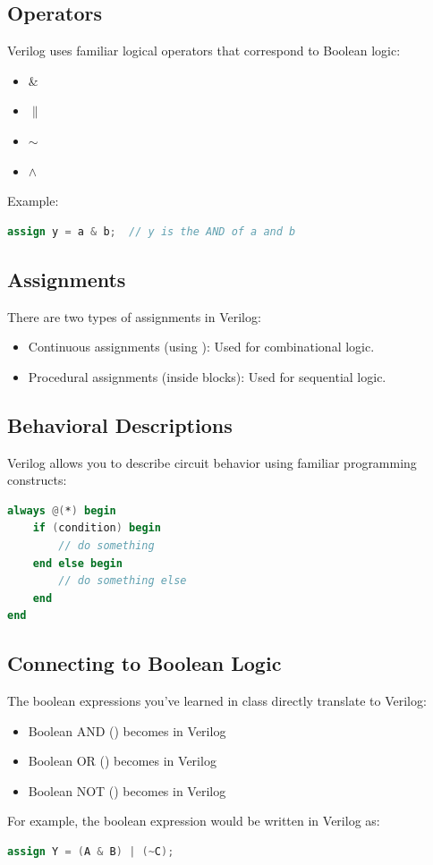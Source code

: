 \documentclass[12pt]{labmanual}
\begin{document}
\subsection{Operators}

Verilog uses familiar logical operators that correspond to Boolean logic:

\begin{itemize}
  \item {} \& 
  \item {} $\|$
  \item {} $\sim $
  \item {} $\wedge$
\end{itemize}

Example: \begin{lstlisting}[language=verilog]
assign y = a & b;  // y is the AND of a and b
\end{lstlisting}


\subsection{Assignments}
There are two types of assignments in Verilog:
\begin{itemize}
  \item Continuous assignments (using ): Used for combinational logic.
  \item Procedural assignments (inside  blocks): Used for sequential logic.
\end{itemize}

\subsection{Behavioral Descriptions}
Verilog allows you to describe circuit behavior using familiar programming constructs:
\begin{lstlisting}[language=verilog]    
always @(*) begin
    if (condition) begin
        // do something
    end else begin
        // do something else
    end
end
\end{lstlisting}

\subsection{Connecting to Boolean Logic}
The boolean expressions you've learned in class directly translate to Verilog:
\begin{itemize}
  \item Boolean AND () becomes  in Verilog
  \item Boolean OR () becomes  in Verilog
  \item Boolean NOT () becomes  in Verilog
\end{itemize}
For example, the boolean expression  would be written in Verilog as:
\begin{lstlisting}[language=verilog]
assign Y = (A & B) | (~C);
\end{lstlisting}
\end{document}
